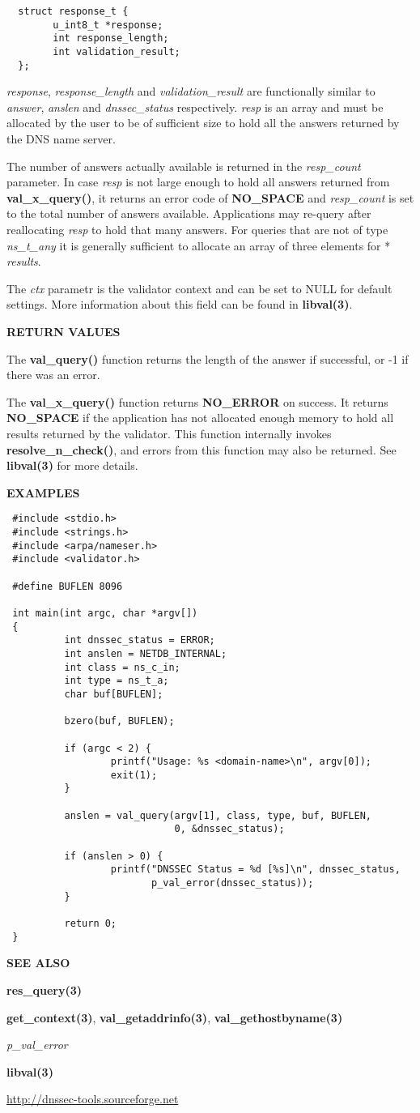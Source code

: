 \begin{verbatim}
  struct response_t {
        u_int8_t *response;
        int response_length;
        int validation_result;
  };
\end{verbatim}

{\it response}, {\it response\_length} and {\it validation\_result} are
functionally similar to {\it answer}, {\it anslen} and {\it dnssec\_status}
respectively.  {\it resp} is an array and must be allocated by the user to
be of sufficient size to hold all the answers returned by the DNS name server.

The number of answers actually available is returned in the {\it resp\_count}
parameter.  In case {\it resp} is not large enough to hold all answers
returned from {\bf val\_x\_query()}, it returns an error code of {\bf
NO\_SPACE} and {\it resp\_count} is set to the total number of answers
available.  Applications may re-query after reallocating {\it resp} to hold
that many answers.  For queries that are not of type {\it ns\_t\_any} it is
generally sufficient to allocate an array of three elements for *{\it
results}.

The {\it ctx} parametr is the validator context and can be set to NULL for
default settings.  More information about this field can be found in
{\bf libval(3)}.

{\bf RETURN VALUES}

The {\bf val\_query()} function returns the length of the answer if
successful, or -1 if there was an error.

The {\bf val\_x\_query()} function returns {\bf NO\_ERROR} on success.  It
returns {\bf NO\_SPACE} if the application has not allocated enough memory
to hold all results returned by the validator.  This function internally
invokes {\bf resolve\_n\_check()}, and errors from this function may also be
returned.  See {\bf libval(3)} for more details.

{\bf EXAMPLES}
\begin{verbatim}
 #include <stdio.h>
 #include <strings.h>
 #include <arpa/nameser.h>
 #include <validator.h>
 
 #define BUFLEN 8096

 int main(int argc, char *argv[])
 {
          int dnssec_status = ERROR;
          int anslen = NETDB_INTERNAL;
          int class = ns_c_in;
          int type = ns_t_a;
          char buf[BUFLEN];

          bzero(buf, BUFLEN);

          if (argc < 2) {
                  printf("Usage: %s <domain-name>\n", argv[0]);
                  exit(1);
          }
 
          anslen = val_query(argv[1], class, type, buf, BUFLEN,
                             0, &dnssec_status);

          if (anslen > 0) {
                  printf("DNSSEC Status = %d [%s]\n", dnssec_status,
                         p_val_error(dnssec_status));
          }

          return 0;
 }
\end{verbatim}

{\bf SEE ALSO}

{\bf res\_query(3)}

{\bf get\_context(3)}, {\bf val\_getaddrinfo(3)}, {\bf val\_gethostbyname(3)}

{\it p\_val\_error}

{\bf libval(3)}

\url{http://dnssec-tools.sourceforge.net}

